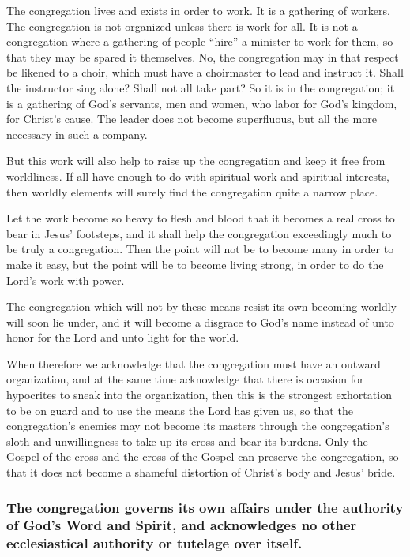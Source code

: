 The congregation lives and exists in order to work. It is a gathering of workers. The congregation is not organized unless there is work for all. It is not a congregation where a gathering of people “hire” a minister to work for them, so that they may be spared it themselves. No, the congregation may in that respect be likened to a choir, which must have a choirmaster to lead and instruct it. Shall the instructor sing alone? Shall not all take part? So it is in the congregation; it is a gathering of God’s servants, men and women, who labor for God’s kingdom, for Christ’s cause. The leader does not become superfluous, but all the more necessary in such a company.

But this work will also help to raise up the congregation and keep it free from worldliness. If all have enough to do with spiritual work and spiritual interests, then worldly elements will surely find the congregation quite a narrow place.

Let the work become so heavy to flesh and blood that it becomes a real cross to bear in Jesus’ footsteps, and it shall help the congregation exceedingly much to be truly a congregation. Then the point will not be to become many in order to make it easy, but the point will be to become living strong, in order to do the Lord’s work with power.

The congregation which will not by these means resist its own becoming worldly will soon lie under, and it will become a disgrace to God’s name instead of unto honor for the Lord and unto light for the world.

When therefore we acknowledge that the congregation must have an outward organization, and at the same time acknowledge that there is occasion for hypocrites to sneak into the organization, then this is the strongest exhortation to be on guard and to use the means the Lord has given us, so that the congregation’s enemies may not become its masters through the congregation’s sloth and unwillingness to take up its cross and bear its burdens. Only the Gospel of the cross and the cross of the Gospel can preserve the congregation, so that it does not become a shameful distortion of Christ’s body and Jesus’ bride.




\subsubsection{The congregation governs its own affairs under the authority of God’s Word and Spirit, and acknowledges no other ecclesiastical authority or tutelage over itself.}

